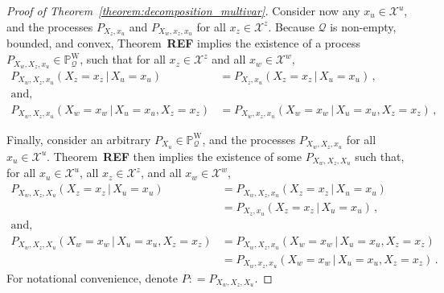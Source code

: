 \documentclass[10pt]{paper}
\theoremstyle{definition}
\newcommand{\states}{\mathcal{X}}
\newcommand{\processes}{\mathbb{P}}
\newcommand{\wprocesses}{\processes^{\mathrm{W}}}
\newcommand{\rateset}{\mathcal{Q}}
\newcommand{\coloneqq}{:\!=}
\begin{document}
\begin{proof}[Proof of Theorem~\ref{theorem:decomposition_multivar}]
Consider now any $x_u\in\states^u$, and the processes $P_{X_z,x_u}$ and $P_{X_w,x_z,x_u}$ for all $x_z\in\states^z$. Because $\rateset$ is non-empty, bounded, and convex, Theorem~{\bf REF} implies the existence of a process $P_{X_w,X_z,x_u}\in\wprocesses_\rateset$, such that for all $x_z\in\states^z$ and all $x_w\in\states^w$,
\begin{align*}
P_{X_w,X_z,x_u}(X_z=x_z\,\vert\,X_u=x_u) &= P_{X_z,x_u}(X_z=x_z\,\vert\,X_u=x_u)\,, \\
\text{and,} \\
P_{X_w,X_z,x_u}(X_w=x_w\,\vert\,X_u=x_u,X_z=x_z) &= P_{X_w,x_z,x_u}(X_w=x_w\,\vert\,X_u=x_u,X_z=x_z)\,,
\end{align*}

Finally, consider an arbitrary $P_{X_u}\in\wprocesses_\rateset$, and the processes $P_{X_w,X_z,x_u}$ for all $x_u\in\states^u$. Theorem~{\bf REF} then implies the existence of some $P_{X_w,X_z,X_u}$ such that, for all $x_u\in\states^u$, all $x_z\in\states^z$, and all $x_w\in\states^w$,
\begin{align*}
P_{X_w,X_z,X_u}(X_z=x_z\,\vert\,X_u=x_u) &= P_{X_w,X_z,x_u}(X_z=x_z\,\vert\,X_u=x_u) \\
 &= P_{X_z,x_u}(X_z=x_z\,\vert\,X_u=x_u)\,, \\
\text{and,} \\
P_{X_w,X_z,X_u}(X_w=x_w\,\vert\,X_u=x_u,X_z=x_z) &= P_{X_w,X_z,x_u}(X_w=x_w\,\vert\,X_u=x_u,X_z=x_z) \\
 &= P_{X_w,x_z,x_u}(X_w=x_w\,\vert\,X_u=x_u,X_z=x_z)\,.
\end{align*}
For notational convenience, denote $P\coloneqq P_{X_w,X_z,X_u}$.


\end{proof}
\end{document}
